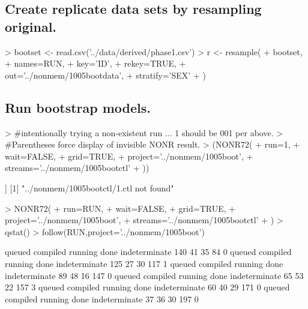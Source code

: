 \subsection{Create replicate data sets by resampling original.}
\begin{Schunk}
\begin{Sinput}
>  bootset <- read.csv('../data/derived/phase1.csv')
>  r <- resample(
+  	bootset,
+  	names=RUN,
+  	key='ID',
+  	rekey=TRUE,
+  	out='../nonmem/1005bootdata',
+  	stratify='SEX'
+  )
\end{Sinput}
\end{Schunk}
\subsection{Run bootstrap models.}
\begin{Schunk}
\begin{Sinput}
> #intentionally trying a non-existent run ... 1 should be 001 per above. 
> #Parentheses force display of invisible NONR result.
> (NONR72(
+      run=1,
+      wait=FALSE,
+      grid=TRUE,
+      project='../nonmem/1005boot',
+      streams='../nonmem/1005bootctl'
+ ))
\end{Sinput}
\begin{Soutput}
[[1]]
[1] "../nonmem/1005bootctl/1.ctl not found"
\end{Soutput}
\begin{Sinput}
> NONR72(
+      run=RUN,
+      wait=FALSE,
+      grid=TRUE,
+      project='../nonmem/1005boot',
+      streams='../nonmem/1005bootctl'
+ )
> qstat()
> follow(RUN,project='../nonmem/1005boot')
\end{Sinput}
\begin{Soutput}
       queued      compiled       running          done indeterminate 
          140            41            35            84             0 
       queued      compiled       running          done indeterminate 
          125            27            30           117             1 
       queued      compiled       running          done indeterminate 
           89            48            16           147             0 
       queued      compiled       running          done indeterminate 
           65            53            22           157             3 
       queued      compiled       running          done indeterminate 
           60            40            29           171             0 
       queued      compiled       running          done indeterminate 
           37            36            30           197             0 

\end{Soutput}
\end{Schunk}
